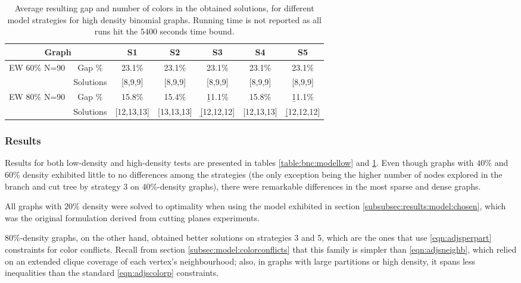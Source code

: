 \begin{table}[h]
\centering
\begin{tabular}{|cc|c|c|c|c|c|}
\hline
\multicolumn{2}{|c|}{Graph} & \multicolumn{1}{|c|}{S1} & \multicolumn{1}{|c|}{S2} & \multicolumn{1}{|c|}{S3} & \multicolumn{1}{|c|}{S4} & \multicolumn{1}{|c|}{S5}
\\
\hline
\multirow{2}{*}{EW 60\% N=90} & Gap \% & 23.1\%  & 23.1\% & 23.1\% & 23.1\% & 23.1\% \\
& Solutions & [8,9,9] & [8,9,9] & [8,9,9] & [8,9,9] & [8,9,9]
\\
\hline
\multirow{2}{*}{EW 80\% N=90} & Gap \% & 15.8\% & 15.4\%  & \b{11.1}\%  & 15.8\%  & \b{11.1}\%  \\
& Solutions & [12,13,13] & [13,13,13] & \b{[12,12,12]} & [12,13,13] & \b{[12,12,12]}
\\
\hline 
 \end{tabular} 
 \caption{Average resulting gap and number of colors in the obtained solutions, for different model strategies for high density binomial graphs. Running time is not reported as all runs hit the $5400$ seconds time bound.}
\label{table:bnc:modelhigh}

\end{table}

\subsubsection*{Results}

Results for both low-density and high-density tests are presented in tables \ref{table:bnc:modellow} and \ref{table:bnc:modelhigh}. Even though graphs with $40\%$ and $60\%$ density exhibited little to no differences among the strategies (the only exception being the higher number of nodes explored in the branch and cut tree by strategy 3 on $40\%$-density graphs), there were remarkable differences in the most sparse and dense graphs.

All graphs with $20\%$ density were solved to optimality when using the model exhibited in section \ref{subsubsec:results:model:chosen}, which was the original formulation derived from cutting planes experiments.

$80\%$-density graphs, on the other hand, obtained better solutions on strategies 3 and 5, which are the ones that use \ref{eqn:adjsperpart} constraints for color conflicts. Recall from section \ref{subsec:model:colorconflicts} that this family is simpler than \ref{eqn:adjsneighb}, which relied on an extended clique coverage of each vertex's neighbourhood; also, in graphs with large partitions or high density, it spans less inequalities than the standard \ref{eqn:adjscolorp} constraints.

